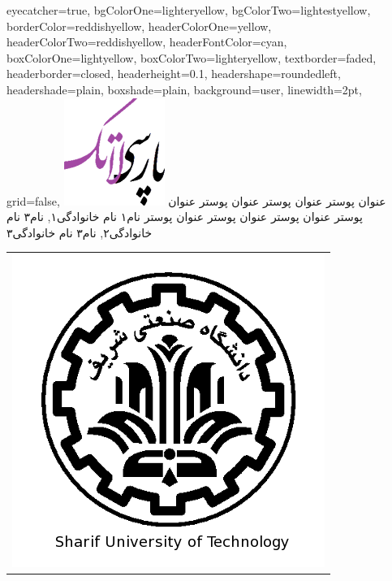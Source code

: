 \documentclass[debug,a0paper,portrait,persian]{xebaposter}
\begin{document}
      \begin{poster}%
      {
      eyecatcher=true,
      bgColorOne=lighteryellow,
      bgColorTwo=lightestyellow,
      borderColor=reddishyellow,
      headerColorOne=yellow,
      headerColorTwo=reddishyellow,
      headerFontColor=cyan,
      boxColorOne=lightyellow,
      boxColorTwo=lighteryellow,
      textborder=faded,
      headerborder=closed,
      headerheight=0.1\textheight,
      headershape=roundedleft,
      headershade=plain,
      boxshade=plain,
      background=user,
      linewidth=2pt,
      grid=false,
      }
 {
      \includegraphics[height=0.07\textheight]{logo}
 }
 {عنوان پوستر عنوان پوستر عنوان پوستر عنوان پوستر عنوان پوستر عنوان پوستر عنوان پوستر 
}
 {\large نام۱ نام خانوادگی۱, نام۳ نام خانوادگی۲, نام۳ نام خانوادگی۳ 
 \\%
 {\normalsize\texttt{}}}
 {
\begin{tabular}{r}
    \includegraphics[height=0.07 \textheight]{shariflogo}\\
\end{tabular}
 }


\end{poster}
\end{document}
